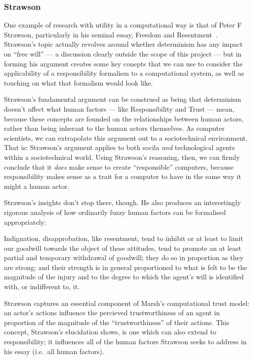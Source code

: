 \subsubsection{Strawson}
One example of research with utility in a computational way is that of Peter F Strawson, particularly in his seminal essay, Freedom and Resentment~\cite{strawson}. Strawson's topic actually revolves around whether determinism has any impact on ``free will'' --- a discussion clearly outside the scope of this project --- but in forming his argument creates some key conepts that we can use to consider the applicability of a responsibility formalism to a computational system, as well as touching on what that formalism would look like.\par

Strawson's fundamental argument can be construed as being that determinism doesn't affect what human factors --- like Responsibility and Trust --- mean, because these concepts are founded on the relationships between human actors, rather than being inherant to the human actors themselves. As computer scientists, we can extrapolate this argument out to a sociotechnical environment. That is: Strawson's argument applies to both socila \emph{and} technological agents within a sociotechnical world. Using Strawson's reasoning, then, we can firmly conclude that it \emph{does} make sense to create ``responsible'' computers, because responsibility makes sense as a trait for a computer to have in the same way it might a human actor.\par

Strawson's insights don't stop there, though. He also produces an interestingly rigorous analysis of how ordinarily fuzzy human factors can be formalised appropriately:

\begin{displayquote}
    Indignation, disapprobation, like resentment, tend to inhibit or at least to limit our goodwill towards the object of these attitudes, tend to promote an at least partial and temporary withdrawal of goodwill; they do so in proportion as they are strong; and their strength is in general proportioned to what is felt to be the magnitude of the injury and to the degree to which the agent’s will is identified with, or indifferent to, it.
\end{displayquote}\cite{strawson}\par

Strawson captures an essential component of Marsh's computational trust model: an actor's actions influence the percieved trustworthiness of an agent in proportion of the magnitude of the ``trustworthiness'' of their actions. This concept, Strawson's elucidation shows, is one which can also extend to responsibility; it influences all of the human factors Strawson seeks to address in his essay (i.e.\ all human factors).\par

